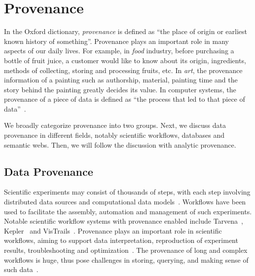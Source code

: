 \section{Provenance}
In the Oxford dictionary, \emph{provenance} is defined as ``the place of origin or earliest known history of something''. Provenance plays an important role in many aspects of our daily lives. For example, in \emph{food} industry, before purchasing a bottle of fruit juice, a customer would like to know about its origin, ingredients, methods of collecting, storing and processing fruits, etc. In \emph{art}, the provenance information of a painting such as authorship, material, painting time and the story behind the painting greatly decides its value. In computer systems, the provenance of a piece of data is defined as ``the process that led to that piece of data''~\cite{Moreau2011}. 

We broadly categorize provenance into two groups.  Next, we discuss data provenance in different fields, notably scientific workflows, databases and semantic webs. Then, we will follow the discussion with analytic provenance.

\subsection{Data Provenance}
\label{sub:lr-data-provenane}
Scientific experiments may consist of thousands of steps, with each step involving distributed data sources and computational data models~\cite{Gil2007}. Workflows have been used to facilitate the assembly, automation and management of such experiments. Notable scientific workflow systems with provenance enabled include Tarvena~\cite{Zhao2008}, Kepler~\cite{Bowers2006} and VisTrails~\cite{Bavoil2005}. Provenance plays an important role in scientific workflows, aiming to support data interpretation, reproduction of experiment results, troubleshooting and optimization~\cite{Miles2007}.  The provenance of long and complex workflows is huge, thus pose challenges in storing, querying, and making sense of such data~\cite{Davidson2007}.

